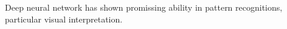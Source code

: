 Deep neural network has shown promissing ability in pattern recognitions, particular visual interpretation.  